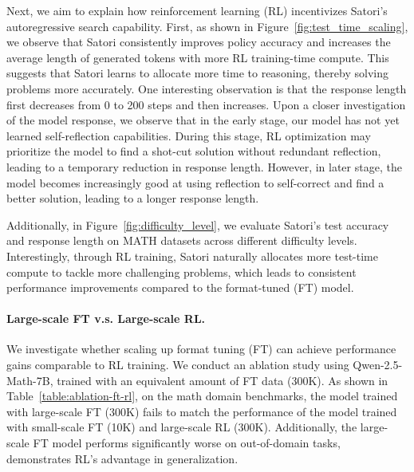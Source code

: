 Next, we aim to explain how reinforcement learning (RL) incentivizes Satori's autoregressive search capability. First, as shown in Figure~\ref{fig:test_time_scaling}, we observe that Satori consistently improves policy accuracy and increases the average length of generated tokens with more RL training-time compute. This suggests that Satori learns to allocate more time to reasoning, thereby solving problems more accurately. One interesting observation is that the response length first decreases from 0 to 200 steps and then increases. Upon a closer investigation of the model response, we observe that in the early stage, our model has not yet learned self-reflection capabilities. During this stage, RL optimization may prioritize the model to find a shot-cut solution without redundant reflection, leading to a temporary reduction in response length. However, in later stage, the model becomes increasingly good at using reflection to self-correct and find a better solution, leading to a longer response length.
 
Additionally, in Figure~\ref{fig:difficulty_level}, we evaluate Satori's test accuracy and response length on MATH datasets across different difficulty levels. Interestingly, through RL training, Satori naturally allocates more test-time compute to tackle more challenging problems, which leads to consistent performance improvements compared to the format-tuned (FT) model.



\paragraph{Large-scale FT v.s. Large-scale RL.}

We investigate whether scaling up format tuning (FT) can achieve performance gains comparable to RL training. We conduct an ablation study using Qwen-2.5-Math-7B, trained with an equivalent amount of FT data (300K). As shown in Table~\ref{table:ablation-ft-rl}, on the math domain benchmarks, the model trained with large-scale FT (300K) fails to match the performance of the model trained with small-scale FT (10K) and large-scale RL (300K). Additionally, the large-scale FT model performs significantly worse on out-of-domain tasks, demonstrates RL’s advantage in generalization.


